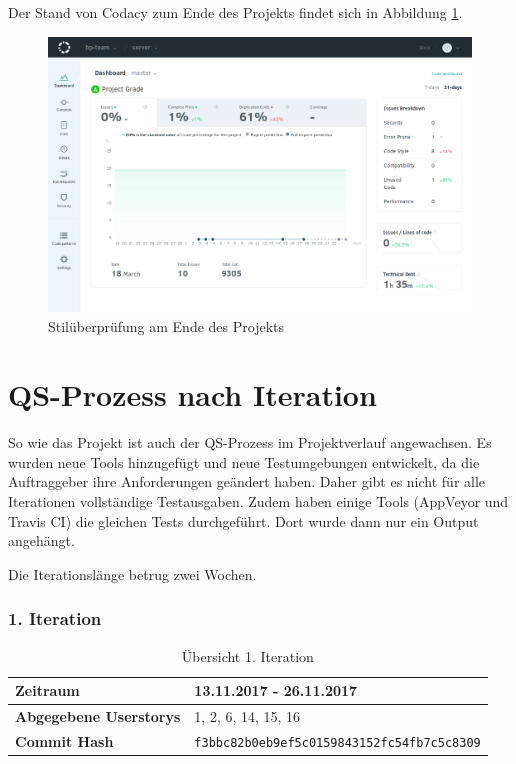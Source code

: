\documentclass[accentcolor=tud9c,12pt,paper=a4]{tudreport}
\begin{document}
	Der Stand von Codacy zum Ende des Projekts findet sich in Abbildung \ref{codacy_png}.
	\begin{figure}[t]
		\centering
	\includegraphics[width=.9\textwidth]{codacy}
		\caption{Stilüberprüfung am Ende des Projekts}
		\label{codacy_png}
	\end{figure}

	\section{QS-Prozess nach Iteration}
	So wie das Projekt ist auch der QS-Prozess im Projektverlauf angewachsen. Es wurden neue Tools hinzugefügt
	und neue Testumgebungen entwickelt, da die Auftraggeber ihre Anforderungen geändert haben. Daher gibt
	es nicht für alle Iterationen vollständige Testausgaben. Zudem haben einige Tools (AppVeyor und Travis CI)
	die gleichen Tests durchgeführt. Dort wurde dann nur ein Output angehängt.

	Die Iterationslänge betrug zwei Wochen.
	
	\subsubsection{1. Iteration}
	\begin{table}[H]
	\begin{center}
		\begin{tabular}{| l | l |}
			\hline
			\textbf{Zeitraum} & 13.11.2017 - 26.11.2017\\\hline
			\textbf{Abgegebene Userstorys} & 1, 2, 6, 14, 15, 16 \\\hline
			\textbf{Commit Hash} & \texttt{f3bbc82b0eb9ef5c0159843152fc54fb7c5c8309} \\\hline
		\end{tabular}
		\caption{Übersicht 1. Iteration}
	\end{center}
	\end{table}
\end{document}
